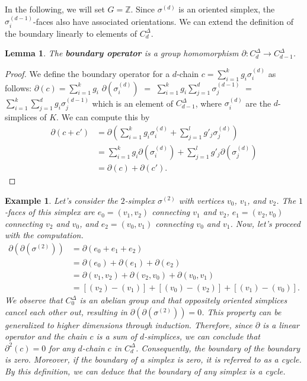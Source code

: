 \documentclass{amsart}
\newtheorem{lemma}[definition]{Lemma}
\newtheorem{example}[definition]{Example}
\begin{document}
In the following, we will set $G = \mathbb{Z}$. Since $\sigma^{(d)}$ is an oriented simplex, the $\sigma^{(d-1)}_i$-faces also have associated orientations. We can extend the definition of the boundary linearly to elements of $C^\Delta_d$.

\begin{lemma}
The \textbf{boundary operator} is a group homomorphism $\partial: C^\Delta_d \rightarrow C^\Delta_{d-1}$.
\end{lemma}
\begin{proof}
We define the boundary operator for a $d$-chain $c = \sum_{i=1}^{k} g_i \sigma_i^{(d)}$ as follows: $\partial(c) = \sum_{i=1}^{k} g_i$ $\partial(\sigma_i^{(d)})$ $=$ $\sum_{i=1}^{k} g_i \sum_{j=1}^{d} \sigma_j^{(d-1)}$ $=$ $\sum_{i=1}^{k} \sum_{j=1}^{d} g_i \sigma_j^{(d-1)}$ which is an element of $C^\Delta_{d-1}$, where $\sigma_i^{(d)}$ are the $d$-simplices of $K$. We can compute this by
\begin{align}
\partial(c + c') &= \partial(\sum_{i=1}^{k} g_i \sigma_i^{(d)} + \sum_{j=1}^{l} g'_j \sigma_j^{(d)}) \\
&= \sum_{i=1}^{k} g_i \partial(\sigma_i^{(d)}) + \sum_{j=1}^{l} g'_j \partial(\sigma_j^{(d)}) \\
&= \partial(c) + \partial(c').
\end{align}
\end{proof}

\begin{example}
Let's consider the $2$-simplex $\sigma^{(2)}$ with vertices $v_0$, $v_1$, and $v_2$. The $1$-faces of this simplex are $e_0 = (v_1,v_2)$ connecting $v_1$ and $v_2$, $e_1 = (v_2,v_0)$ connecting $v_2$ and $v_0$, and $e_2 = (v_0,v_1)$ connecting $v_0$ and $v_1$. Now, let's proceed with the computation.
\begin{align}
\partial(\partial(\sigma^{(2)})) &= \partial (e_0+e_1+e_2) \\
&= \partial(e_0) + \partial(e_1) + \partial(e_2) \\
&= \partial(v_1,v_2) + \partial(v_2,v_0) + \partial(v_0,v_1) \\
&= [(v_2)-(v_1)] + [(v_0)-(v_2)]+[(v_1)-(v_0)].
\end{align}
We observe that $C^\Delta_0$ is an abelian group and that oppositely oriented simplices cancel each other out, resulting in $\partial(\partial(\sigma^{(2)})) = 0$. This property can be generalized to higher dimensions through induction. Therefore, since $\partial$ is a linear operator and the chain $c$ is a sum of $d$-simplices, we can conclude that $\partial^2(c) = 0$ for any $d$-chain $c$ in $C^\Delta_d$. Consequently, the boundary of the boundary is zero. Moreover, if the boundary of a simplex is zero, it is referred to as a \emph{cycle}. By this definition, we can deduce that the boundary of any simplex is a cycle.
\end{example}
\end{document}
